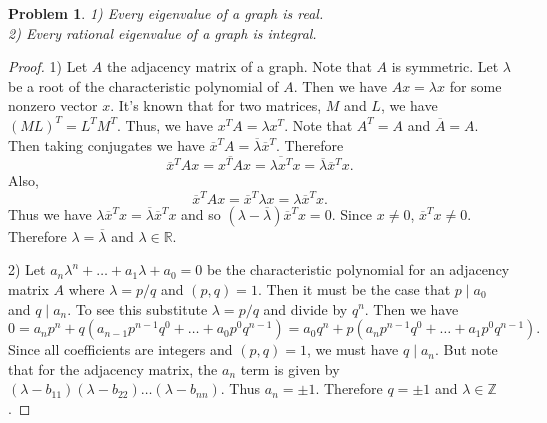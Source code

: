 \documentclass{article}
\newtheorem{problem}{Problem}
\begin{document}
\begin{flushleft}
\begin{problem}
1) Every eigenvalue of a graph is real.\\
2) Every rational eigenvalue of a graph is integral.
\end{problem}
\begin{proof}
1) Let $A$ the adjacency matrix of a graph. Note that $A$ is symmetric. Let $\lambda$ be a root of the characteristic polynomial of $A$. Then we have $Ax = \lambda x$ for some nonzero vector $x$. It's known that for two matrices, $M$ and $L$, we have $(ML)^T = L^T M^T$. Thus, we have $x^T A = \lambda x^T$. Note that $A^T = A$ and $\overline{A} = A$. Then taking conjugates we have $\overline{x}^T A = \overline{\lambda} \overline{x}^T$. Therefore
\[
\overline{x}^T A x = \overline{x^T A} x = \overline{\lambda x^T} x = \overline{\lambda} \overline{x}^T x.
\]
Also,
\[
\overline{x}^T A x = \overline{x}^T \lambda x = \lambda \overline{x}^T x.
\]
Thus we have $\lambda \overline{x}^T x = \overline{\lambda} \overline{x}^T x$ and so $(\lambda - \overline{\lambda}) \overline{x}^T x = 0$. Since $x \neq 0$, $\overline{x}^T x \neq 0$. Therefore $\lambda = \overline{\lambda}$ and $\lambda \in \mathbb{R}$.\newline

2) Let $a_n \lambda^n + \dots + a_1 \lambda + a_0 = 0$ be the characteristic polynomial for an adjacency matrix $A$ where $\lambda = p/q$ and $(p,q) = 1$. Then it must be the case that $p \mid a_0$ and $q \mid a_n$. To see this substitute $\lambda = p/q$ and divide by $q^n$. Then we have
\[
0 = a_np^n + q(a_{n-1}p^{n-1}q^0 + \dots + a_0p^0q^{n-1}) = a_0q^n + p(a_np^{n-1}q^0 + \dots + a_1p^0q^{n-1}).
\]
Since all coefficients are integers and $(p,q) = 1$, we must have $q \mid a_n$. But note that for the adjacency matrix, the $a_n$ term is given by $(\lambda - b_{11})(\lambda - b_{22}) \dots (\lambda - b_{nn})$. Thus $a_n = \pm 1$. Therefore $q = \pm 1$ and $\lambda \in \mathbb{Z}$.
\end{proof}


\end{flushleft}
\end{document}
